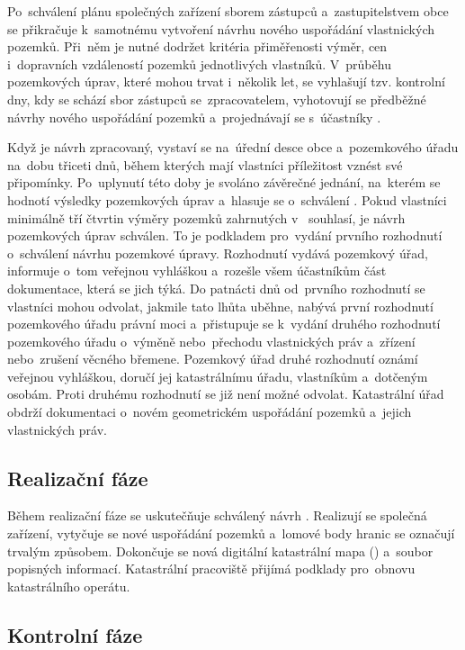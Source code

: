 Po~schválení plánu společných zařízení sborem zástupců
a~zastupitelstvem obce se přikračuje k~samotnému vytvoření návrhu
nového uspořádání vlastnických pozemků. Při~něm je nutné dodržet
kritéria přiměřenosti výměr, cen i~dopravních vzdáleností pozemků
jednotlivých vlastníků. V~průběhu pozemkových úprav, které mohou trvat
i~několik let, se vyhlašují tzv. kontrolní dny, kdy se schází sbor
zástupců se~zpraco\-vatelem, vyhotovují se předběžné návrhy nového
uspořádání pozemků a~projednávají se s~účastníky .

Když je návrh zpracovaný, vystaví se na~úřední desce obce
a~pozemkového úřadu na~dobu třiceti dnů, během kterých mají vlastníci
příležitost vznést své připomínky. Po~uplynutí této doby je svoláno
závěrečné jednání, na~kterém se hodnotí výsledky pozemkových úprav
a~hlasuje se o~schválení . Pokud vlastníci minimálně tří
čtvrtin výměry pozemků zahrnutých v~ souhlasí, je návrh
pozemkových úprav schválen. To je podkladem pro~vydání prvního
rozhodnutí o~schválení návrhu pozemkové úpravy. Rozhodnutí vydává
pozemkový úřad, informuje o~tom veřejnou vyhláškou a~rozešle všem
účastníkům část dokumentace, která se jich týká. Do patnácti dnů
od~prvního rozhodnutí se vlastníci mohou odvolat, jakmile tato lhůta
uběhne, nabývá první rozhodnutí pozemkového úřadu právní moci
a~přistupuje se k~vydání druhého rozhodnutí pozemkového úřadu o~výměně
nebo~přechodu vlastnických práv a~zřízení nebo~zrušení věcného
břemene. Pozemkový úřad druhé rozhodnutí oznámí veřejnou vyhláškou,
doručí jej katastrálnímu úřadu, vlastníkům a~dotčeným osobám. Proti
druhému rozhodnutí se již není možné odvolat. Kata\-strální úřad
obdrží dokumentaci o~novém geometrickém uspořádání pozemků a~jejich
vlastnických práv.

\subsection{Realizační fáze}
\label{realizacni_faze}

Během realizační fáze se uskutečňuje schválený návrh
. Realizují se společná zařízení, vytyčuje se nové uspořádání
pozemků a~lomové body hranic se označují trvalým způsobem. Dokončuje
se nová digitální katastrální mapa () a~soubor popisných
informací. Katastrální pracoviště přijímá podklady pro~obnovu
katastrálního operátu.

\subsection{Kontrolní fáze}
\label{kontrolni_faze}

